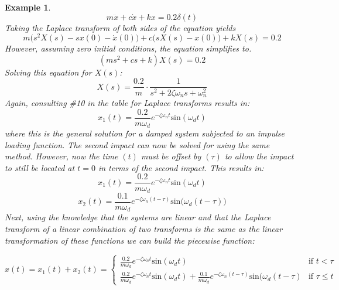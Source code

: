 \documentclass[12pt,letter]{article}
\newtheorem{ex}{Example}
\numberwithin{ex}{section} %
\newenvironment{example}{\begin{mdframed}[middlelinewidth=0.5mm]\begin{ex}\normalfont}{\end{ex}\end{mdframed}}
\numberwithin{re}{section} %
\begin{document}
\begin{example}
\begin{equation}
m\ddot{x} +c\dot{x} +kx =0.2 \delta(t)
\end{equation}
Taking the Laplace transform of both sides of the equation yields 
\begin{equation}
m\big(s^2X(s)-sx(0) - \dot{x}(0)\big) + c\big(sX(s)-x(0)\big) +kX(s) = 0.2
\end{equation}
However, assuming zero initial conditions, the equation simplifies to. 
\begin{equation}
(ms^2 + cs +k)X(s) = 0.2
\end{equation}
Solving this equation for $X(s)$:
\begin{equation}
X(s) = \frac{0.2}{m} \cdot \frac{1}{s^2 + 2 \zeta \omega_n s + \omega_n^2}
\end{equation}
Again, consulting \#10 in the table for Laplace transforms results in:
\begin{equation}
x_1(t) = \frac{0.2}{m \omega_d} e^{-\zeta \omega_n t} \text{sin}(\omega_dt)
\end{equation}
where this is the general solution for a damped system subjected to an impulse loading function. The second impact can now be solved for using the same method. However, now the time $(t)$ must be offset by $(\tau)$ to allow the impact to still be located at $t=0$ in terms of the second impact. This results in:
\begin{equation}
	x_1(t) = \frac{0.2}{m \omega_d} e^{-\zeta \omega_n t} \text{sin}(\omega_dt)
\end{equation}
\begin{equation}
	x_2(t) = \frac{0.1}{m \omega_d} e^{-\zeta \omega_n (t-\tau)} \text{sin}\big(\omega_d(t-\tau)\big)
\end{equation}
Next, using the knowledge that the systems are linear and that the Laplace transform of a linear combination of two transforms is the same as the linear transformation of these functions we can build the piecewise function:

\[
  x(t) = x_1(t) + x_2(t) =
  \begin{cases}
\frac{0.2}{m \omega_d} e^{-\zeta \omega_n t} \text{sin}(\omega_dt) & \text{if } t < \tau \\
\frac{0.2}{m \omega_d} e^{-\zeta \omega_n t} \text{sin}(\omega_dt)  + \frac{0.1}{m \omega_d} e^{-\zeta \omega_n (t-\tau)} \text{sin}(\omega_d(t-\tau) & \text{if } \tau \leq t 
  \end{cases}
\]



\end{example}
\end{document}
